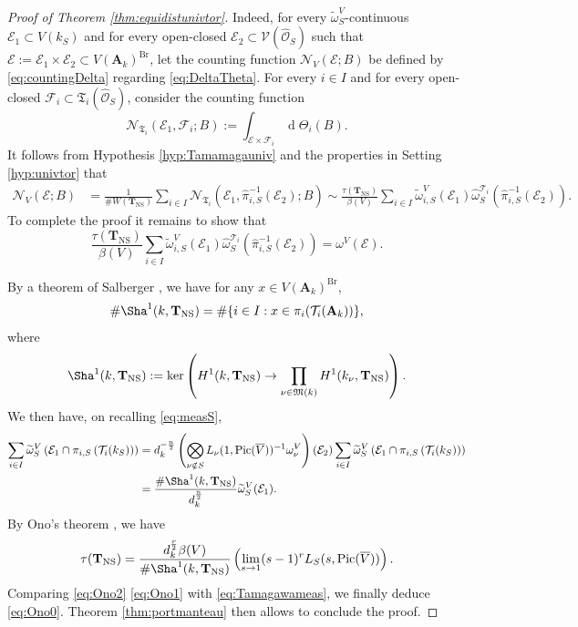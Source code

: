 \documentclass[11pt,letterpaper]{amsart}
\newcommand{\CE}{{\mathcal {E}}}
\newcommand{\CF}{{\mathcal {F}}}
\newcommand{\CN}{{\mathcal {N}}}
\newcommand{\CO}{{\mathcal {O}}}
\newcommand{\CV}{{\mathcal {V}}}
\newcommand{\RA}{{\mathbf {A}}}
\newcommand{\Pic}{\operatorname{Pic}}
\newcommand{\CTUT}{\mathcal{T}}
\newcommand{\FTUT}{\mathfrak{T}}
\newcommand{\CTNS}{\mathbf{T}_{\operatorname{NS}}}
\theoremstyle{plain}
\numberwithin{equation}{section}
\theoremstyle{definition}
\theoremstyle{remark}
\begin{document}
\begin{proof}[Proof of Theorem \ref{thm:equidistunivtor}]
	 Indeed, for every $\widetilde{\omega}_S^V$-continuous $\CE_1\subset V(k_S)$ and for every open-closed $\CE_2\subset \CV(\widehat{\CO}_S)$ such that $\CE:=\CE_1\times\CE_2\subset V(\RA_k)^{\operatorname{Br}}$, let the counting function  $\CN_{V}(\CE;B)$ be defined by \eqref{eq:countingDelta} regarding \eqref{eq:DeltaTheta}. For every $i\in I$ and for every open-closed $\CF_i\subset \FTUT_i(\widehat{\CO}_S)$, consider the counting function  \begin{equation}\label{eq:UTcounting}
	\CN_{\FTUT_i}(\CE_1,\CF_i;B):=\int_{\CE\times\CF_i} \operatorname{d}\Theta_i(B).
	\end{equation}
	It follows from Hypothesis \ref{hyp:Tamamagauniv} and the properties in  Setting \ref{hyp:univtor} that 
	\begin{align*}
		\CN_{V}(\CE;B)&=\frac{1}{\# W(\CTNS)}\sum_{i\in I}\CN_{\FTUT_i}(\CE_1,\widehat{\pi}_{i,S}^{-1}(\CE_2);B)\sim \frac{\tau(\CTNS)}{\beta(V)}\sum_{i\in I}\widetilde{\omega}_{i,S}^V\left(\CE_1\right) \widehat{\omega}_S^{\CTUT_i}(\widehat{\pi}_{i,S}^{-1}(\CE_2)).	\end{align*} 
	To complete the proof it remains to show that
	\begin{equation}\label{eq:Ono0}
		\frac{\tau(\CTNS)}{\beta(V)}\sum_{i\in I}\widetilde{\omega}_{i,S}^V\left(\CE_1\right) \widehat{\omega}_S^{\CTUT_i}(\widehat{\pi}_{i,S}^{-1}(\CE_2))=\omega^V(\CE).
	\end{equation}
	
 By a theorem of Salberger \cite[Lemma 6.17]{Salberger}, we have for any $x\in V(\RA_k)^{\operatorname{Br}}$, 
	$$\#\Sha^1(k,\CTNS)=\#\{i\in I:x\in \pi_i(\CTUT_i(\RA_k))\},$$ 	 where
	$$\Sha^1(k,\CTNS):=\ker\left(H^1(k,\CTNS)\to \prod_{\nu\in\mathfrak{M}(k)}H^1(k_\nu,\CTNS)\right).$$ We then have, on recalling \eqref{eq:measS},
	\begin{equation}\label{eq:Ono2}
		\begin{split}
				\sum_{i\in I}\widetilde{\omega}_S^V\left(\CE_1\cap\pi_{i,S}\left(\CTUT_i(k_S)\right)\right)&=d_k^{-\frac{n}{2}}\left(\bigotimes_{\nu\notin S}L_\nu(1,\Pic(\overline{V}))^{-1}\omega_\nu^V\right)(\CE_2)\sum_{i\in I}\widetilde{\omega}_S^V\left(\CE_1\cap\pi_{i,S}\left(\CTUT_i(k_S)\right)\right)\\&=\frac{\#\Sha^1(k,\CTNS)}{d_k^{\frac{n}{2}}}\widetilde{\omega}_S^V(\CE_1).
		\end{split}
	\end{equation}
	By Ono's theorem \cite[Main Theorem]{Ono}, we have
\begin{equation}\label{eq:Ono1}
	\tau(\CTNS)=\frac{d_k^{\frac{r}{2}}\beta(V)}{\# \Sha^1(k,\CTNS)}\left(\lim_{s\to 1}(s-1)^rL_S(s,\Pic(\overline{V}))\right).
\end{equation}
	Comparing \eqref{eq:Ono2} \eqref{eq:Ono1} with \eqref{eq:Tamagawameas}, we finally deduce \eqref{eq:Ono0}.
Theorem  \ref{thm:portmanteau} then allows to conclude the proof.
\end{proof}
\end{document}
